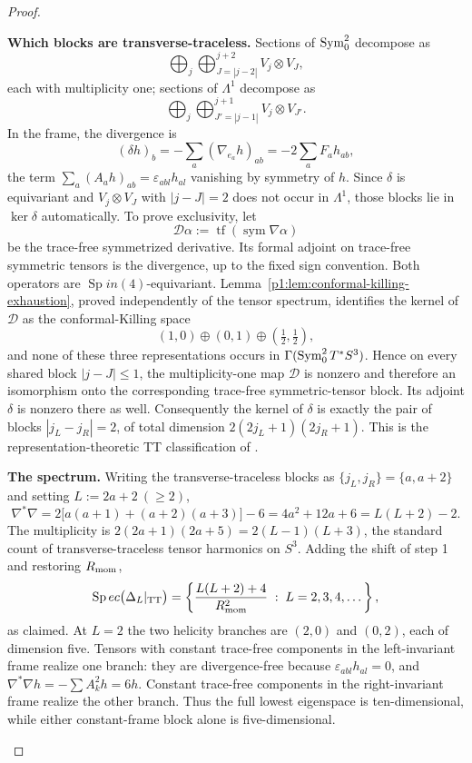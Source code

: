 \documentclass[11pt]{article}
\begin{document}
\begin{proof}
\begin{proofsteps}
\item \textbf{Which blocks are transverse-traceless.}
Sections of \(\operatorname{Sym}^2_0\) decompose as
\[
 \bigoplus_{j}\bigoplus_{J=|j-2|}^{j+2} V_j\otimes V_J,
\]
each with multiplicity one; sections of \(\Lambda^1\) decompose as
\[
 \bigoplus_j\bigoplus_{J'=|j-1|}^{j+1}V_j\otimes V_{J'}.
\]
In the frame, the divergence is
\[
  (\delta h)_b=-\sum_a(\nabla_{e_a}h)_{ab}=-2\sum_aF_ah_{ab},
\]
the term \(\sum_a(A_ah)_{ab}=\varepsilon_{abl}h_{al}\) vanishing by symmetry of
\(h\).  Since \(\delta\) is equivariant and \(V_j\otimes V_J\) with
\(|j-J|=2\) does not occur in \(\Lambda^1\), those blocks lie in \(\ker\delta\)
automatically.  To prove exclusivity, let
\[
  \mathcal D\alpha:=\operatorname{tf}(\operatorname{sym}\nabla\alpha)
\]
be the trace-free symmetrized derivative.  Its formal adjoint on trace-free
symmetric tensors is the divergence, up to the fixed sign convention.  Both
operators are \(\operatorname{Sp}in(4)\)-equivariant.
Lemma~\ref{p1:lem:conformal-killing-exhaustion}, proved independently of
the tensor spectrum, identifies the kernel of \(\mathcal D\) as the
conformal-Killing space
\[
  (1,0)\oplus(0,1)\oplus(\tfrac12,\tfrac12),
\]
and none of these three representations occurs in
\(\Gamma(\operatorname{Sym}^2_0T^*S^3)\).  Hence on every shared block
\(|j-J|\le1\), the multiplicity-one map \(\mathcal D\) is nonzero and
therefore an isomorphism onto the corresponding trace-free symmetric-tensor
block.  Its adjoint \(\delta\) is nonzero there as well.  Consequently the
kernel of \(\delta\) is exactly the pair of blocks \(|j_L-j_R|=2\), of total
dimension \(2(2j_L+1)(2j_R+1)\).  This is the representation-theoretic TT
classification of \cite{Higuchi1987,Higuchi2002Erratum}.

\item \textbf{The spectrum.}
Writing the transverse-traceless blocks as \(\{j_L,j_R\}=\{a,a+2\}\) and setting
\(L:=2a+2\ (\ge2)\),
\[
  \nabla^*\nabla
  =2\bigl[a(a+1)+(a+2)(a+3)\bigr]-6
  =4a^2+12a+6
  =L(L+2)-2 .
\]
The multiplicity is \(2(2a+1)(2a+5)=2(L-1)(L+3)\), the standard count of
transverse-traceless tensor harmonics on \(S^3\).  Adding the shift of step 1
and restoring \(R_{\mathrm{mom}}\),
\[
  \operatorname{Sp}ec\bigl(\Delta_L|_{\mathrm{TT}}\bigr)
  =\left\{\frac{L(L+2)+4}{R_{\mathrm{mom}}^2}\;:\;L=2,3,4,\dots\right\},
\]
as claimed.  At \(L=2\) the two helicity branches are \((2,0)\) and
\((0,2)\), each of dimension five.  Tensors with constant trace-free
components in the left-invariant frame realize one branch: they are
divergence-free because \(\varepsilon_{abl}h_{al}=0\), and
\(\nabla^*\nabla h=-\sum A_k^2h=6h\).  Constant trace-free components in the
right-invariant frame realize the other branch.  Thus the full lowest
eigenspace is ten-dimensional, while either constant-frame block alone is
five-dimensional.
\end{proofsteps}
\end{proof}
\end{document}
